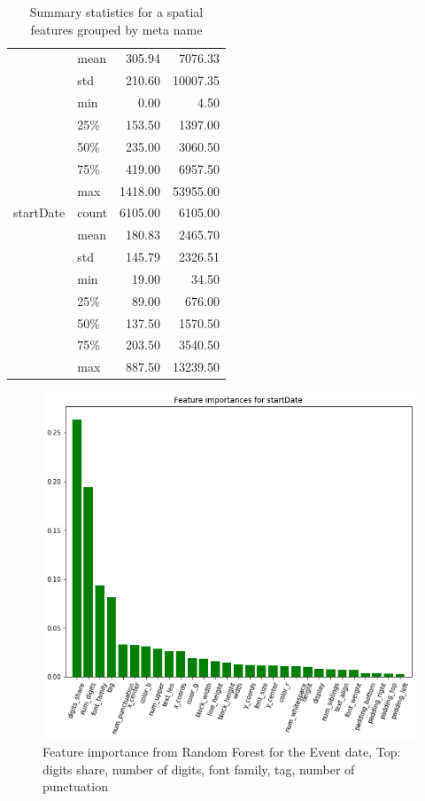 \begin{table}
\begin{center}
\begin{tabular}{llrr}
            & mean &     305.94 &    7076.33 \\
            & std &     210.60 &   10007.35 \\
            & min &       0.00 &       4.50 \\
            & 25\% &     153.50 &    1397.00 \\
            & 50\% &     235.00 &    3060.50 \\
            & 75\% &     419.00 &    6957.50 \\
            & max &    1418.00 &   53955.00 \\
\midrule
startDate & count &    6105.00 &    6105.00 \\
            & mean &     180.83 &    2465.70 \\
            & std &     145.79 &    2326.51 \\
            & min &      19.00 &      34.50 \\
            & 25\% &      89.00 &     676.00 \\
            & 50\% &     137.50 &    1570.50 \\
            & 75\% &     203.50 &    3540.50 \\
            & max &     887.50 &   13239.50 \\
\bottomrule
\end{tabular}

\caption{Summary statistics for a spatial features grouped by meta name}
\label{table:spatialDistr}
\end{center}
\end{table}  


\begin{figure}[h]
\begin{center}
\includegraphics[width=1.0\textwidth]{figures/importanceDate}
\caption{Feature importance from Random Forest for the Event date, Top: digits share, number of digits, font family, tag, number of punctuation}
\label{fig:importanceDate}
\end{center}
\end{figure}

